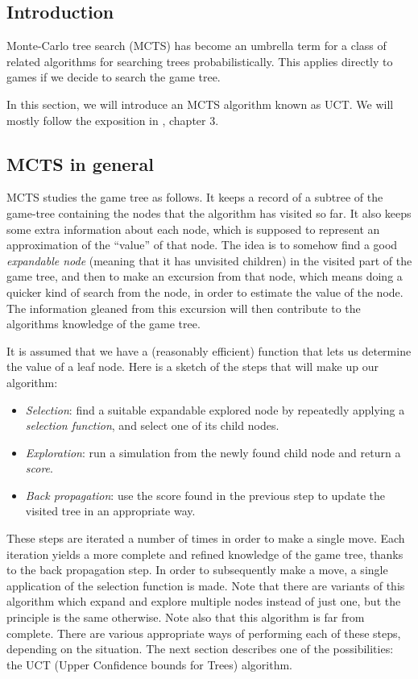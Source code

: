 \subsection {Introduction}

Monte-Carlo tree search (MCTS) has become an umbrella term for a class of related algorithms for searching trees probabilistically.
This applies directly to games if we decide to search the game tree.

In this section, we will introduce an MCTS algorithm known as UCT.
We will mostly follow the exposition in \citep{mcts_survey12}, chapter 3.

\subsection {MCTS in general}

MCTS studies the game tree as follows.
It keeps a record of a subtree of the game-tree containing the nodes that the algorithm has visited so far.
It also keeps some extra information about each node, which is supposed to represent an approximation of the ``value'' of that node.
The idea is to somehow find a good \emph{expandable node} (meaning that it has unvisited children) in the visited part of the game tree, and then to make an excursion from that node, which means doing a quicker kind of search from the node, in order to estimate the value of the node. The information gleaned from this excursion will then contribute to the algorithms knowledge of the game tree.

It is assumed that we have a (reasonably efficient) function that lets us determine the value of a leaf node.
Here is a sketch of the steps that will make up our algorithm:

\begin{itemize}
\item \emph{Selection}: find a suitable expandable explored node by repeatedly applying a \emph{selection function}, and select one of its child nodes.
\item \emph{Exploration}: run a simulation from the newly found child node and return a \emph{score}.
\item \emph{Back propagation}: use the score found in the previous step to update the visited tree in an appropriate way.
\end{itemize}
These steps are iterated a number of times in order to make a single move. Each iteration yields a more complete and refined knowledge of the game tree, thanks to the back propagation step. In order to subsequently make a move, a single application of the selection function is made.
Note that there are variants of this algorithm which expand and explore multiple nodes instead of just one, but the principle is the same otherwise.
Note also that this algorithm is far from complete. There are various appropriate ways of performing each of these steps, depending on the situation.
The next section describes one of the possibilities: the UCT (Upper Confidence bounds for Trees) algorithm.

